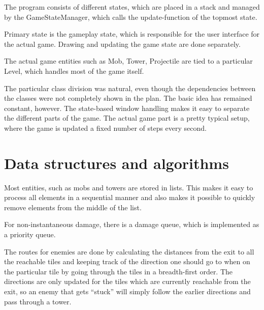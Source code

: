 \documentclass[11pt]{article}
\begin{document}
The program consists of different states, which are placed in a stack
and managed by the GameStateManager, which calls the update-function
of the topmost state.

Primary state is the gameplay state, which is responsible for the user
interface for the actual game. Drawing and updating the game state are
done separately.

The actual game entities such as Mob, Tower, Projectile are tied to a
particular Level, which handles most of the game itself.

The particular class division was natural, even though the
dependencies between the classes were not completely shown in the
plan. The basic idea has remained constant, however. The state-based
window handling makes it easy to separate the different parts of the
game. The actual game part is a pretty typical setup, where the game
is updated a fixed number of steps every second.

 
\section{Data structures and algorithms}
\label{sec-3}



Most entities, such as mobs and towers are stored in lists. This makes
it easy to process all elements in a sequential manner and also makes
it possible to quickly remove elements from the middle of the list.

For non-instantaneous damage, there is a damage queue, which is
implemented as a priority queue.
 
The routes for enemies are done by calculating the distances from the
exit to all the reachable tiles and keeping track of the direction one
should go to when on the particular tile by going through the tiles in
a breadth-first order. The directions are only updated for the tiles
which are currently reachable from the exit, so an enemy that gets
``stuck'' will simply follow the earlier directions and pass through a
tower.
\end{document}
